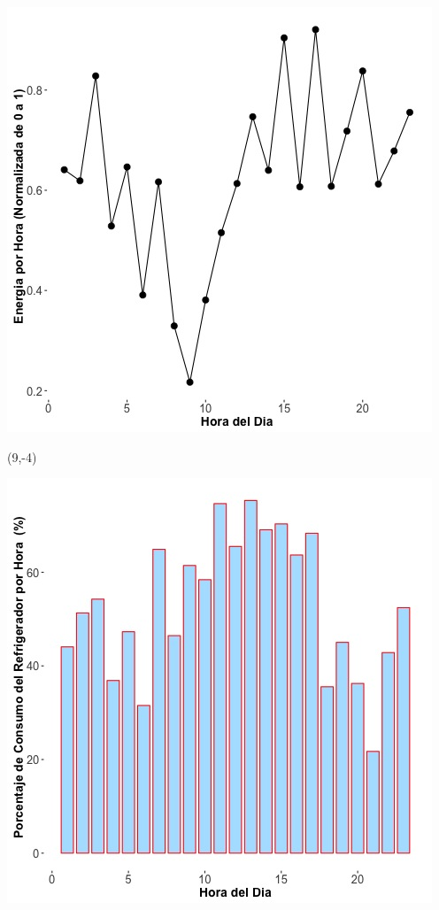 \documentclass{article}\usepackage[]{graphicx}\usepackage[]{color}
\newenvironment{knitrout}{}{} %
\begin{document}
\begin{knitrout}
\color{fgcolor}
\includegraphics[scale=0.75]{figure/A7_fplot_norm_median} 
\end{knitrout}


 \begin{textblock}{1}(9,-4)
\begin{minipage}{20em}
\begingroup

\endgroup
\end{minipage}
\end{textblock}

 \vspace{2cm}

\begin{knitrout}
\color{fgcolor}
\includegraphics[scale=0.65]{figure/A7_fridge_energy_pct.jpg} 
\end{knitrout}
\end{document}
